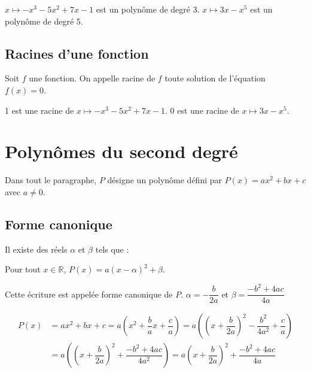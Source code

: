 \documentclass[french]{book}
\newcommand{\R}{\mathbb {R}}
\begin{document}
\begin{exemple}
$x\mapsto -x^{3}-5x^{2}+7x-1$ est un polynôme de degré 3.
$x\mapsto 3x-x^{5}$ est un polynôme de degré 5.
\end{exemple}%

\subsection{Racines d'une fonction}
\begin{defn}
Soit $f$ une fonction. On appelle racine de $f$ toute solution de l'équation $f(x)=0$.
\vspace{5mm}
\end{defn}

\begin{exemple}
1 est une racine de $x\mapsto -x^{3}-5x^{2}+7x-1$. 0 est une racine de $x\mapsto 3x-x^{5}$.
\end{exemple}
\section{Polynômes du second degré}
Dans tout le paragraphe, $P$ désigne un polynôme défini par $P(x)=ax^{2}+bx+c$ avec $a\neq0$.
\subsection{Forme canonique}
\begin{prop}
Il existe des réels $\alpha$ et $\beta$ tels que :
\begin{center}
Pour tout $x\in\R$, $P(x)=a(x-\alpha)^{2}+\beta$.
\end{center}
Cette écriture est appelée forme canonique de $P$. $\alpha=-\dfrac{b}{2a}$ et $\beta=\dfrac{-b^{2}+4ac}{4a}$
\end{prop}


\begin{demo}
\begin{align*}
P(x)&=ax^{2}+bx+c=a\left(x^{2}+\dfrac{b}{a}x+\dfrac{c}{a}\right)=a\left(\left(x+\dfrac{b}{2a}\right)^{2}-\dfrac{b^{2}}{4a^{2}}+\dfrac{c}{a}\right)\\
&=a\left(\left(x+\dfrac{b}{2a}\right)^{2}+\dfrac{-b^{2}+4ac}{4a^{2}}\right)=a\left(x+\dfrac{b}{2a}\right)^{2}+\dfrac{-b^{2}+4ac}{4a}
\end{align*}
\end{demo}
\end{document}
